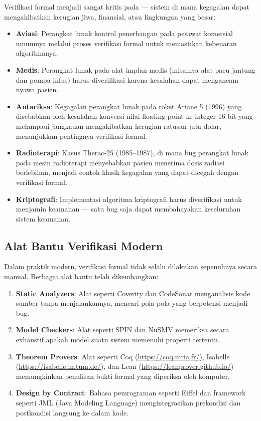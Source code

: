 Verifikasi formal menjadi sangat kritis pada  --- sistem di mana kegagalan dapat mengakibatkan kerugian jiwa, finansial, atau lingkungan yang besar:

\begin{itemize}
    \item \textbf{Aviasi}: Perangkat lunak kontrol penerbangan pada pesawat komersial umumnya melalui proses verifikasi formal untuk memastikan kebenaran algoritmanya.
    \item \textbf{Medis}: Perangkat lunak pada alat implan medis (misalnya alat pacu jantung dan pompa infus) harus diverifikasi karena kesalahan dapat mengancam nyawa pasien.
    \item \textbf{Antariksa}: Kegagalan perangkat lunak pada roket Ariane 5 (1996) yang disebabkan oleh kesalahan konversi nilai floating-point ke integer 16-bit yang melampaui jangkauan mengakibatkan kerugian ratusan juta dolar, menunjukkan pentingnya verifikasi formal.
    \item \textbf{Radioterapi}: Kasus Therac-25 (1985--1987), di mana bug perangkat lunak pada mesin radioterapi menyebabkan pasien menerima dosis radiasi berlebihan, menjadi contoh klasik kegagalan yang dapat dicegah dengan verifikasi formal.
    \item \textbf{Kriptografi}: Implementasi algoritma kriptografi harus diverifikasi untuk menjamin keamanan --- satu bug saja dapat membahayakan keseluruhan sistem keamanan.
\end{itemize}

\subsection{Alat Bantu Verifikasi Modern}

Dalam praktik modern, verifikasi formal tidak selalu dilakukan sepenuhnya secara manual. Berbagai alat bantu telah dikembangkan:

\begin{enumerate}
    \item \textbf{Static Analyzers}: Alat seperti Coverity dan CodeSonar menganalisis kode sumber tanpa menjalankannya, mencari pola-pola yang berpotensi menjadi bug.
    \item \textbf{Model Checkers}: Alat seperti SPIN dan NuSMV memeriksa secara exhaustif apakah model suatu sistem memenuhi properti tertentu.
    \item \textbf{Theorem Provers}: Alat seperti Coq (\url{https://coq.inria.fr/}), Isabelle (\url{https://isabelle.in.tum.de/}), dan Lean (\url{https://leanprover.github.io/}) memungkinkan penulisan bukti formal yang diperiksa oleh komputer.
    \item \textbf{Design by Contract}: Bahasa pemrograman seperti Eiffel dan framework seperti JML (Java Modeling Language) mengintegrasikan prekondisi dan postkondisi langsung ke dalam kode.
\end{enumerate}

